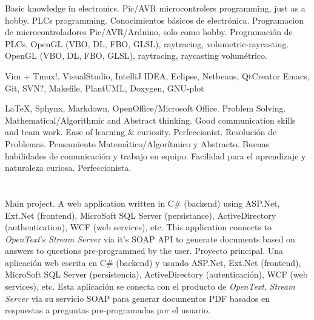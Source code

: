 \documentclass[11pt,a4paper,sans]{moderncv}
\begin{document}

\cvcomputer
    {}
        {\ml
        {Basic knowledge in electronics. Pic/AVR microcontrolers programming,
        just as a hobby. PLCs programming.}
        {Conocimientos básicos de electrónica. Programacion de
        microcontroladores Pic/AVR/Arduino, solo como hobby. Programación de
        PLCs.}}
    {}
        {\ml
        {OpenGL (VBO, DL, FBO, GLSL), raytracing, volumetric-raycasting.}
        {OpenGL (VBO, DL, FBO, GLSL), raytracing, raycasting volumétrico.}}


\cvcomputer
    {}
        {Vim + Tmux!, VisualStudio, IntelliJ IDEA, Eclipse, Netbeans,
        QtCreator}
    {}
        {Emacs, Git, SVN?, Makefile, PlantUML, Doxygen, GNU-plot}

\cvcomputer
    {}
        {\LaTeX, Sphynx, Markdown,  OpenOffice/Microsoft Office.}
    {}
        {\ml
        {Problem Solving. Mathematical/Algorithmic and Abstract thinking. Good
        communication skills and team work. Ease of learning \& curiosity.
        Perfeccionist.}
        {Resolución de Problemas. Pensamiento Matemático/Algorítmico y
        Abstracto. Buenas habilidades de comunicación y trabajo en equipo.
        Facilidad para el aprendizaje y naturaleza curiosa.  Perfeccionista.}}

\clearpage

\section{}


    {\ml
    {Main project. A web application written in C\# (backend) using ASP.Net,
    Ext.Net (frontend), MicroSoft SQL Server (persistance), ActiveDirectory
    (authentication), WCF (web services), etc. This application connects to
    \textit{OpenText}'s \textit{Stream Server} via it's SOAP API to generate
    documents based on answers to questions pre-programmed by the user.}
    {Proyecto principal. Una aplicación web escrita en C\# (backend) y usando
    ASP.Net, Ext.Net (frontend), MicroSoft SQL Server (persistencia),
    ActiveDirectory (autenticación), WCF (web services), etc. Esta aplicación
    se conecta con el producto de \textit{OpenText}, \textit{Stream Server} via
    su servicio SOAP para generar documentos PDF basados en respuestas a
    preguntas pre-programadas por el usuario.}
}
\end{document}
